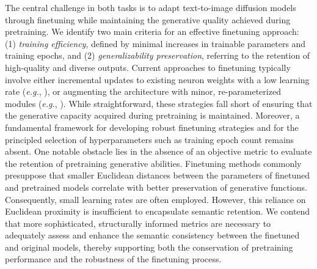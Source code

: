 The central challenge in both tasks is to adapt text-to-image diffusion models through finetuning while maintaining the generative quality achieved during pretraining. We identify two main criteria for an effective finetuning approach: (1) \emph{training efficiency}, defined by minimal increases in trainable parameters and training epochs, and (2) \emph{generalizability preservation}, referring to the retention of high-quality and diverse outputs. Current approaches to finetuning typically involve either incremental updates to existing neuron weights with a low learning rate (\emph{e.g.}, \cite{ruiz2023dreambooth}), or augmenting the architecture with minor, re-parameterized modules (\emph{e.g.}, \cite{hulora2022,zhang2023adding}). While straightforward, these strategies fall short of ensuring that the generative capacity acquired during pretraining is maintained. Moreover, a fundamental framework for developing robust finetuning strategies and for the principled selection of hyperparameters such as training epoch count remains absent. One notable obstacle lies in the absence of an objective metric to evaluate the retention of pretraining generative abilities. Finetuning methods commonly presuppose that smaller Euclidean distances between the parameters of finetuned and pretrained models correlate with better preservation of generative functions. Consequently, small learning rates are often employed. However, this reliance on Euclidean proximity is insufficient to encapsulate semantic retention. We contend that more sophisticated, structurally informed metrics are necessary to adequately assess and enhance the semantic consistency between the finetuned and original models, thereby supporting both the conservation of pretraining performance and the robustness of the finetuning process.

